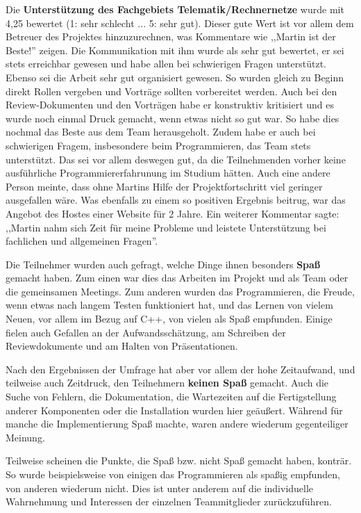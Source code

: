 \documentclass[../review_3.tex]{subfiles}
\begin{document}
Die \textbf{Unterstützung des Fachgebiets Telematik/Rechnernetze} wurde mit 4,25 bewertet (1: sehr schlecht ... 5: sehr gut). Dieser gute Wert ist vor allem dem Betreuer des Projektes hinzuzurechnen, was Kommentare wie ,,Martin ist der Beste!'' zeigen. Die Kommunikation mit ihm wurde als sehr gut bewertet, er sei stets erreichbar gewesen und habe allen bei schwierigen Fragen unterstützt. Ebenso sei die Arbeit sehr gut organisiert gewesen. So wurden gleich zu Beginn direkt Rollen vergeben und Vorträge sollten vorbereitet werden. Auch bei den Review-Dokumenten und den Vorträgen habe er konstruktiv kritisiert und es wurde noch einmal Druck gemacht, wenn etwas nicht so gut war. So habe dies nochmal das Beste aus dem Team herausgeholt. Zudem habe er auch bei schwierigen Fragem, insbesondere beim Programmieren, das Team stets unterstützt. Das sei vor allem deswegen gut, da die Teilnehmenden vorher keine ausführliche Programmiererfahrunung im Studium hätten. Auch eine andere Person meinte, dass ohne Martins Hilfe der Projektfortschritt viel geringer ausgefallen wäre. Was ebenfalls zu einem so positiven Ergebnis beitrug, war das Angebot des Hostes einer Website für 2 Jahre. Ein weiterer Kommentar sagte: ,,Martin nahm sich Zeit für meine Probleme und leistete Unterstützung bei fachlichen und allgemeinen Fragen''.

Die Teilnehmer wurden auch gefragt, welche Dinge ihnen besonders \textbf{Spaß} gemacht haben.
Zum einen war dies das Arbeiten im Projekt und als Team oder die gemeinsamen Meetings. Zum anderen wurden das Programmieren, die Freude, wenn etwas nach langem Testen funktioniert hat, und das Lernen von vielem Neuen, vor allem im Bezug auf C++, von vielen als Spaß empfunden. Einige fielen auch Gefallen an der Aufwandsschätzung, am Schreiben der Reviewdokumente und am Halten von Präsentationen.

Nach den Ergebnissen der Umfrage hat aber vor allem der hohe Zeitaufwand, und teilweise auch Zeitdruck, den Teilnehmern \textbf{keinen Spaß} gemacht. Auch die Suche von Fehlern, die Dokumentation, die Wartezeiten auf die Fertigstellung anderer Komponenten oder die Installation wurden hier geäußert. Während für manche die Implementierung Spaß machte, waren andere wiederum gegenteiliger Meinung.

Teilweise scheinen die Punkte, die Spaß bzw. nicht Spaß gemacht haben, konträr. So wurde beispielsweise von einigen das Programmieren als spaßig empfunden, von anderen wiederum nicht. Dies ist unter anderem auf die individuelle Wahrnehmung und Interessen der einzelnen Teammitglieder zurückzuführen.
\end{document}
